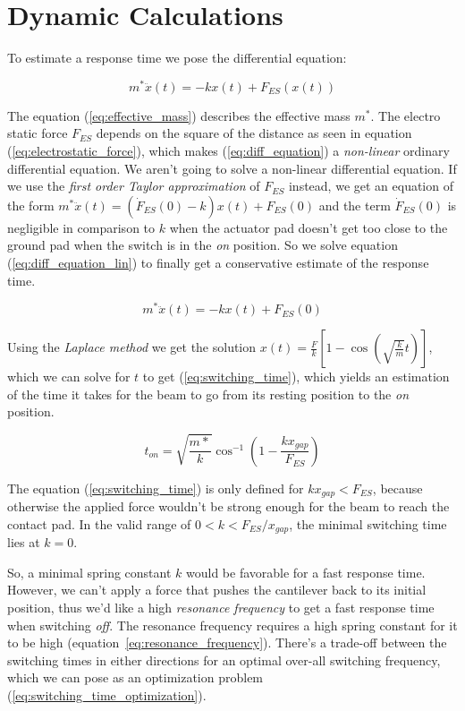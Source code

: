 \appendix
\section{Dynamic Calculations}
\label{appendix}

To estimate a response time we pose the differential equation:

\begin{equation}
    m^* \ddot{x}(t) = -kx(t) + F_{ES}(x(t))
    \label{eq:diff_equation}
\end{equation}

The equation (\ref{eq:effective_mass}) describes the effective mass $m^*$.
The electro static force $F_{ES}$ depends on the square of the distance as seen in equation (\ref{eq:electrostatic_force}), which makes (\ref{eq:diff_equation}) a \emph{non-linear} ordinary differential equation.
We aren't going to solve a non-linear differential equation.
If we use the \emph{first order Taylor approximation} of $F_{ES}$ instead, we get an equation of the form $m^* \ddot{x}(t) = (\dot{F}_{ES}(0) - k) x(t) + F_{ES}(0)$ and the term $\dot{F}_{ES}(0)$ is negligible in comparison to $k$ when the actuator pad doesn't get too close to the ground pad when the switch is in the \emph{on} position.
So we solve equation (\ref{eq:diff_equation_lin}) to finally get a conservative estimate of the response time.

\begin{equation}
    m^* \ddot{x}(t) = -kx(t) + F_{ES}(0)
    \label{eq:diff_equation_lin}
\end{equation}

Using the \emph{Laplace method} we get the solution $x(t) = \frac{F}{k}\left[1-\cos{\left(\sqrt{\frac{k}{m}}t\right)}\right]$, which we can solve for $t$ to get (\ref{eq:switching_time}), which yields an estimation of the time it takes for the beam to go from its resting position to the \emph{on} position.

\begin{equation}
    t_{on} = \sqrt{\frac{m*}{k}} \cos^{-1}{\left( 1 - \frac{k x_{gap}}{F_{ES}} \right)} 
    \label{eq:switching_time}
\end{equation}

The equation (\ref{eq:switching_time}) is only defined for $k x_{gap} < F_{ES}$, because otherwise the applied force wouldn't be strong enough for the beam to reach the contact pad.
In the valid range of $0 < k < F_{ES}/x_{gap}$, the minimal switching time lies at $k = 0$.

So, a minimal spring constant $k$ would be favorable for a fast response time.
However, we can't apply a force that pushes the cantilever back to its initial position, thus we'd like a high \emph{resonance frequency} to get a fast response time when switching \emph{off}.
The resonance frequency requires a high spring constant for it to be high (equation~\ref{eq:resonance_frequency}).
There's a trade-off between the switching times in either directions for an optimal over-all switching frequency, which we can pose as an optimization problem (\ref{eq:switching_time_optimization}).

